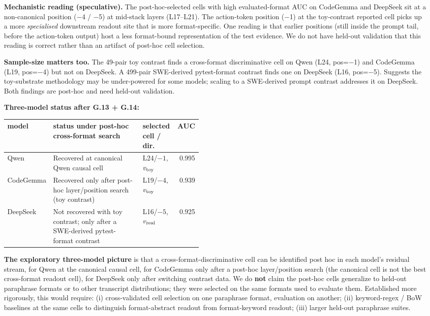 \documentclass[
  11pt,
  a4paper]{article}
\begin{document}
\textbf{Mechanistic reading (speculative).} The post-hoc-selected cells
with high evaluated-format AUC on CodeGemma and DeepSeek sit at a
non-canonical position (\ensuremath{-}4 / \ensuremath{-}5) at mid-stack layers (L17--L21). The
action-token position (\ensuremath{-}1) at the toy-contrast reported cell picks up a
more \emph{specialised} downstream readout site that is more
format-specific. One reading is that earlier positions (still inside the
prompt tail, before the action-token output) host a less format-bound
representation of the test evidence. We do not have held-out validation
that this reading is correct rather than an artifact of post-hoc cell
selection.

\textbf{Sample-size matters too.} The 49-pair toy contrast finds a
cross-format discriminative cell on Qwen (L24, pos=\ensuremath{-}1) and CodeGemma
(L19, pos=\ensuremath{-}4) but not on DeepSeek. A 499-pair SWE-derived pytest-format
contrast finds one on DeepSeek (L16, pos=\ensuremath{-}5). Suggests the toy-substrate
methodology may be under-powered for some models; scaling to a
SWE-derived prompt contrast addresses it on DeepSeek. Both findings are
post-hoc and need held-out validation.

\textbf{Three-model status after G.13 + G.14:}

\begin{center}
\begin{tabular}{l p{0.46\linewidth} l r}
\toprule
model & status under post-hoc cross-format search & selected cell / dir.\ & AUC \\
\midrule
Qwen & Recovered at canonical Qwen causal cell & L24/$-1$, $v_{\rm toy}$ & 0.995 \\
CodeGemma & Recovered only after post-hoc layer/position search (toy contrast) & L19/$-4$, $v_{\rm toy}$ & 0.939 \\
DeepSeek & Not recovered with toy contrast; only after a SWE-derived pytest-format contrast & L16/$-5$, $v_{\rm real}$ & 0.925 \\
\bottomrule
\end{tabular}
\end{center}

\textbf{The exploratory three-model picture} is that a
cross-format-discriminative cell can be identified post hoc in each
model's residual stream, for Qwen at the canonical causal cell, for
CodeGemma only after a post-hoc layer/position search (the canonical
cell is not the best cross-format readout cell), for DeepSeek only after
switching contrast data. We do \textbf{not} claim the post-hoc cells
generalize to held-out paraphrase formats or to other transcript
distributions; they were selected on the same formats used to evaluate
them. Established more rigorously, this would require: (i)
cross-validated cell selection on one paraphrase format, evaluation on
another; (ii) keyword-regex / BoW baselines at the same cells to
distinguish format-abstract readout from format-keyword readout; (iii)
larger held-out paraphrase suites.
\end{document}
